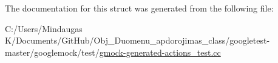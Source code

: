 The documentation for this struct was generated from the following file\+:\begin{DoxyCompactItemize}
\item 
C\+:/\+Users/\+Mindaugas K/\+Documents/\+Git\+Hub/\+Obj\+\_\+\+Duomenu\+\_\+apdorojimas\+\_\+class/googletest-\/master/googlemock/test/\mbox{\hyperlink{googletest-master_2googlemock_2test_2gmock-generated-actions__test_8cc}{gmock-\/generated-\/actions\+\_\+test.\+cc}}\end{DoxyCompactItemize}
